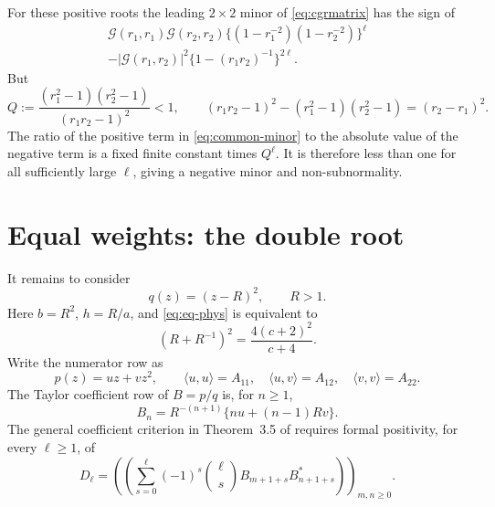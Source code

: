 \documentclass[11pt]{article}
\newcommand{\G}{\mathcal G}
\begin{document}
For these positive roots the leading $2\times2$ minor of
\eqref{eq:cgrmatrix} has the sign of
\begin{multline}\label{eq:common-minor}
 \G(r_1,r_1)\G(r_2,r_2)
 \{(1-r_1^{-2})(1-r_2^{-2})\}^{\ell}\\
 -|\G(r_1,r_2)|^2\{1-(r_1r_2)^{-1}\}^{2\ell}.
\end{multline}
But
\[
 Q:=\frac{(r_1^2-1)(r_2^2-1)}{(r_1r_2-1)^2}<1,
 \qquad
 (r_1r_2-1)^2-(r_1^2-1)(r_2^2-1)=(r_2-r_1)^2.
\]
The ratio of the positive term in \eqref{eq:common-minor} to the absolute
value of the negative term is a fixed finite constant times $Q^\ell$.
It is therefore less than one for all sufficiently large $\ell$, giving a
negative minor and non-subnormality.

\section{Equal weights: the double root}

It remains to consider
\[
 q(z)=(z-R)^2,\qquad R>1.
\]
Here $b=R^2$, $h=R/a$, and \eqref{eq:eq-phys} is equivalent to
\begin{equation}\label{eq:repeat-relation}
 \left(R+R^{-1}\right)^2=\frac{4(c+2)^2}{c+4}.
\end{equation}
Write the numerator row as
\[
 p(z)=uz+vz^2,\qquad
 \langle u,u\rangle=A_{11},\quad
 \langle u,v\rangle=A_{12},\quad
 \langle v,v\rangle=A_{22}.
\]
The Taylor coefficient row of $B=p/q$ is, for $n\ge1$,
\begin{equation}\label{eq:Bn}
 B_n=R^{-(n+1)}\{nu+(n-1)Rv\}.
\end{equation}
The general coefficient criterion in Theorem~3.5 of \cite{CGR} requires
formal positivity, for every $\ell\ge1$, of
\begin{equation}\label{eq:repeat-matrix}
 D_\ell=\left(\!\left(
 \sum_{s=0}^{\ell}(-1)^s\binom{\ell}{s}
 B_{m+1+s}B_{n+1+s}^*
 \right)\!\right)_{m,n\ge0}.
\end{equation}
\end{document}
